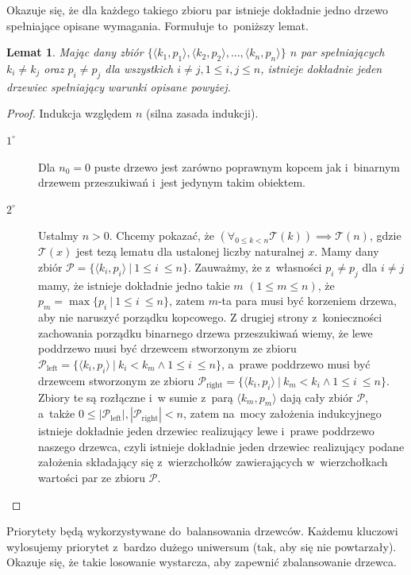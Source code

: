 \documentclass[declaration,shortabstract]{iithesis}
\theoremstyle{definition} \newtheorem{definition}{Definicja}[chapter]
\theoremstyle{remark} \newtheorem{remark}[definition]{Obserwacja}
\theoremstyle{plain} \newtheorem{theorem}[definition]{Twierdzenie}
\theoremstyle{remark} \newtheorem{example}{Przykład}[definition]
\theoremstyle{plain} \newtheorem{lemma}[definition]{Lemat}
\begin{document}
Okazuje się, że dla każdego takiego zbioru par istnieje dokładnie jedno drzewo spełniające opisane wymagania. Formułuje to~poniższy lemat.

\begin{lemma}
    Mając dany zbiór $\{ \langle k_1, p_1 \rangle, \langle k_2, p_2 \rangle, \ldots, \langle k_n, p_n \rangle \}$ $n$ par spełniających $k_i \neq k_j$ oraz $p_i \neq p_j$ dla wszystkich $i \neq j, 1 \leq i, j \leq n$, istnieje dokładnie jeden drzewiec spełniający warunki opisane powyżej.
\end{lemma}

\begin{proof}
Indukcja względem $n$ (silna zasada indukcji).
\begin{description}
    \item[$1^\circ$] Dla $n_0 = 0$ puste drzewo jest zarówno poprawnym kopcem jak i~binarnym drzewem przeszukiwań i~jest jedynym takim obiektem.
    \item[$2^\circ$] Ustalmy $n > 0$. Chcemy pokazać, że $(\forall_{0 \leq k < n} \mathcal{T}(k)) \implies \mathcal{T}(n)$, gdzie $\mathcal{T}(x)$ jest tezą lematu dla ustalonej liczby naturalnej $x$. Mamy dany zbiór $\mathcal{P} = \{ \langle k_i, p_i \rangle \ | \ 1 \leq i~\leq n \}$. Zauważmy, że z~własności $p_i \neq p_j$ dla $i \neq j$ mamy, że istnieje dokładnie jedno takie $m$ $(1 \leq m \leq n)$, że $p_m = \max \{p_i \ |\ 1 \leq i~\leq n \}$, zatem $m$-ta para musi być korzeniem drzewa, aby nie naruszyć porządku kopcowego. Z drugiej strony z~konieczności zachowania porządku binarnego drzewa przeszukiwań wiemy, że lewe poddrzewo musi być drzewcem stworzonym ze zbioru $\mathcal{P}_{\text{left}} = \{ \langle k_i, p_i \rangle \ |\ k_i < k_m \land 1 \leq i~\leq n \}$, a~prawe poddrzewo musi być drzewcem stworzonym ze zbioru $\mathcal{P}_{\text{right}} = \{ \langle k_i, p_i \rangle\ |\ k_m < k_i \land 1 \leq i~\leq n \}$. Zbiory te są rozłączne i~w sumie z~parą $\langle k_m, p_m \rangle$ dają cały zbiór $\mathcal{P}$, a~także $0 \leq |\mathcal{P}_{\text{left}}|, |\mathcal{P}_{\text{right}}| < n$, zatem na~mocy założenia indukcyjnego istnieje dokładnie jeden drzewiec realizujący lewe i~prawe poddrzewo naszego drzewca, czyli istnieje dokładnie jeden drzewiec realizujący podane założenia składający się z~wierzchołków zawierających w~wierzchołkach wartości par ze zbioru $\mathcal{P}$.
\end{description}
\end{proof}

Priorytety będą wykorzystywane do~balansowania drzewców. Każdemu kluczowi wylosujemy priorytet z~bardzo dużego uniwersum (tak, aby się nie powtarzały). Okazuje się, że takie losowanie wystarcza, aby zapewnić zbalansowanie drzewca.
\end{document}
